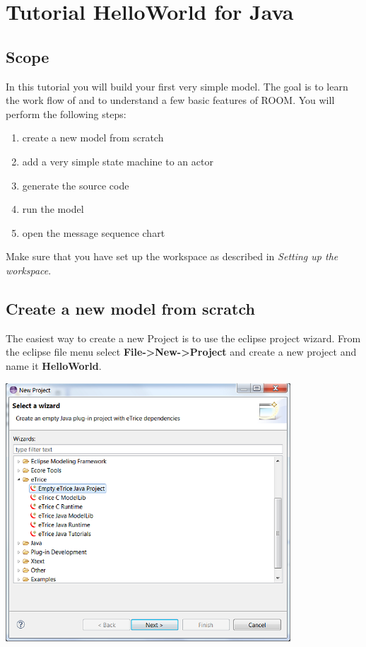 \section{Tutorial HelloWorld for Java}

\subsection{Scope}

In this tutorial you will build your first very simple \eTrice{} model. The goal is to learn the work flow of 
\eTrice{} and to understand a few basic features of ROOM. You will perform the following steps:

\begin{enumerate}
\item create a new model from scratch
\item add a very simple state machine to an actor
\item generate the source code
\item run the model
\item open the message sequence chart
\end{enumerate}

Make sure that you have set up the workspace as described in \textit{Setting up the workspace}.

\subsection{Create a new model from scratch}

The easiest way to create a new \eTrice{} Project is to use the eclipse project wizard. From the eclipse file 
menu select \textbf{File->New->Project} and create a new \eTrice{} project and name it \textbf{HelloWorld}.

\includegraphics[width=0.8\textwidth]{images/015-HelloWorld10.png}

